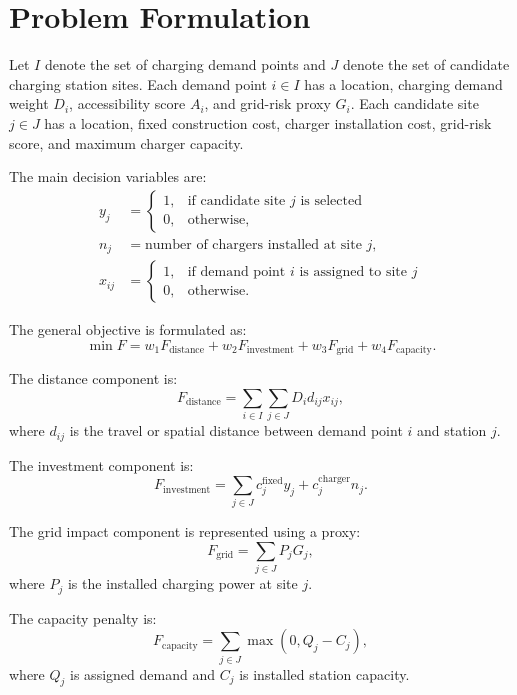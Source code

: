 \section{Problem Formulation}

Let \(I\) denote the set of charging demand points and \(J\) denote the set of candidate charging station sites. Each demand point \(i \in I\) has a location, charging demand weight \(D_i\), accessibility score \(A_i\), and grid-risk proxy \(G_i\). Each candidate site \(j \in J\) has a location, fixed construction cost, charger installation cost, grid-risk score, and maximum charger capacity.

The main decision variables are:
\begin{align}
y_j &= \begin{cases}1, & \text{if candidate site } j \text{ is selected}\\0, & \text{otherwise,}\end{cases}\\
n_j &= \text{number of chargers installed at site } j,\\
x_{ij} &= \begin{cases}1, & \text{if demand point } i \text{ is assigned to site } j\\0, & \text{otherwise.}\end{cases}
\end{align}

The general objective is formulated as:
\begin{equation}
\min F = w_1 F_{\text{distance}} + w_2 F_{\text{investment}} + w_3 F_{\text{grid}} + w_4 F_{\text{capacity}}.
\end{equation}

The distance component is:
\begin{equation}
F_{\text{distance}} = \sum_{i \in I}\sum_{j \in J} D_i d_{ij} x_{ij},
\end{equation}
where \(d_{ij}\) is the travel or spatial distance between demand point \(i\) and station \(j\).

The investment component is:
\begin{equation}
F_{\text{investment}} = \sum_{j \in J} c_j^{\text{fixed}} y_j + c^{\text{charger}}_j n_j.
\end{equation}

The grid impact component is represented using a proxy:
\begin{equation}
F_{\text{grid}} = \sum_{j \in J} P_j G_j,
\end{equation}
where \(P_j\) is the installed charging power at site \(j\).

The capacity penalty is:
\begin{equation}
F_{\text{capacity}} = \sum_{j \in J} \max(0, Q_j - C_j),
\end{equation}
where \(Q_j\) is assigned demand and \(C_j\) is installed station capacity.
